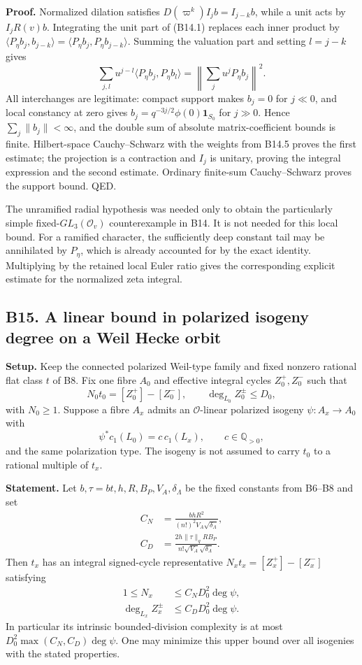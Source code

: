\documentclass[11pt,a4paper]{article}
\theoremstyle{definition}
\begin{document}
\textbf{Proof.} Normalized dilation satisfies \(D(\varpi^k)I_jb=I_{j-k}b\), while a unit acts by \(I_jR(v)b\). Integrating the unit part of (B14.1) replaces each inner product by \(\langle P_\eta b_j,b_{j-k}\rangle=\langle P_\eta b_j,P_\eta b_{j-k}\rangle\). Summing the valuation part and setting \(l=j-k\) gives \[
 \sum_{j,l}u^{j-l}\langle P_\eta b_j,P_\eta b_l\rangle
 =\left\|\sum_j u^jP_\eta b_j\right\|^2.
\] All interchanges are legitimate: compact support makes \(b_j=0\) for \(j\ll0\), and local constancy at zero gives \(b_j=q^{-3j/2}\phi(0)\mathbf1_{S_0}\) for \(j\gg0\). Hence \(\sum_j\|b_j\|<\infty\), and the double sum of absolute matrix-coefficient bounds is finite. Hilbert-space Cauchy--Schwarz with the weights from B14.5 proves the first estimate; the projection is a contraction and \(I_j\) is unitary, proving the integral expression and the second estimate. Ordinary finite-sum Cauchy--Schwarz proves the support bound. QED.

The unramified radial hypothesis was needed only to obtain the particularly simple fixed-\(GL_3(\mathcal O_v)\) counterexample in B14. It is not needed for this local bound. For a ramified character, the sufficiently deep constant tail may be annihilated by \(P_\eta\), which is already accounted for by the exact identity. Multiplying by the retained local Euler ratio gives the corresponding explicit estimate for the normalized zeta integral.

\subsection{B15. A linear bound in polarized isogeny degree on a Weil Hecke orbit}\label{b15.-a-linear-bound-in-polarized-isogeny-degree-on-a-weil-hecke-orbit}

\textbf{Setup.} Keep the connected polarized Weil-type family and fixed nonzero rational flat class \(t\) of B8. Fix one fibre \(A_0\) and effective integral cycles \(Z_0^+,Z_0^-\) such that \[
 N_0t_0=[Z_0^+]-[Z_0^-],\qquad
 \deg_{L_0}Z_0^\pm\le D_0,
\] with \(N_0\ge1\). Suppose a fibre \(A_x\) admits an \(\mathcal O\)-linear polarized isogeny \(\psi:A_x\to A_0\) with \[
 \psi^*c_1(L_0)=c\,c_1(L_x),\qquad c\in\mathbb Q_{>0},
\] and the same polarization type. The isogeny is not assumed to carry \(t_0\) to a rational multiple of \(t_x\).

\textbf{Statement.} Let \(b,\tau=bt,h,R,B_P,V_A,\delta_\Lambda\) be the fixed constants from B6--B8 and set \[
 \begin{aligned}
 C_N&=\frac{b h R^2}{(n!)^2 V_A\sqrt{\delta_\Lambda}},\\
 C_D&=\frac{2h\|\tau\|_q R B_P}{n!\sqrt{V_A}\sqrt{\delta_\Lambda}}.
 \end{aligned}
\] Then \(t_x\) has an integral signed-cycle representative \(N_xt_x=[Z_x^+]-[Z_x^-]\) satisfying \[
 \begin{aligned}
 1\le N_x&\le C_N D_0^2\deg\psi,\\
 \deg_{L_x} Z_x^\pm&\le C_D D_0^2\deg\psi.
 \end{aligned}
\tag{B15.1}
\] In particular its intrinsic bounded-division complexity is at most \(D_0^2\max(C_N,C_D)\deg\psi\). One may minimize this upper bound over all isogenies with the stated properties.
\end{document}
